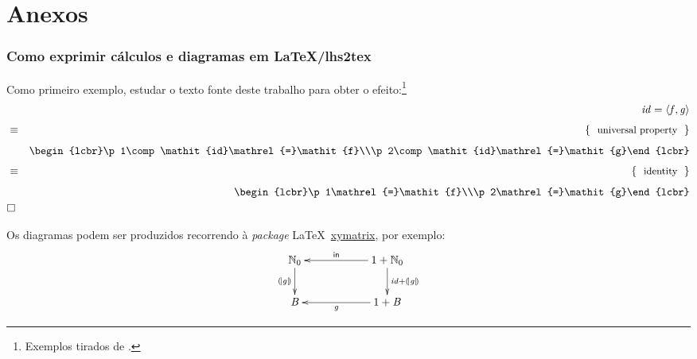 \documentclass[a4paper]{article}
\newcommand{\Conid}[1]{\mathit{#1}}
\newcommand{\Varid}[1]{\mathit{#1}}
\begin{document}
\newpage

\part*{Anexos}

\appendix

\section{Como exprimir cálculos e diagramas em LaTeX/lhs2tex}
Como primeiro exemplo, estudar o texto fonte deste trabalho para obter o
efeito:\footnote{Exemplos tirados de \cite{Ol18}.}
\begin{eqnarray*}
\start
	\ensuremath{\Varid{id}\mathrel{=}\conj{\Varid{f}}{\Varid{g}}}
%
\just\equiv{ universal property }
%
        \ensuremath{\begin{lcbr}\p1\comp \Varid{id}\mathrel{=}\Varid{f}\\\p2\comp \Varid{id}\mathrel{=}\Varid{g}\end{lcbr}}
%
\just\equiv{ identity }
%
        \ensuremath{\begin{lcbr}\p1\mathrel{=}\Varid{f}\\\p2\mathrel{=}\Varid{g}\end{lcbr}}
\qed
\end{eqnarray*}

Os diagramas podem ser produzidos recorrendo à \emph{package} \LaTeX\
\href{https://ctan.org/pkg/xymatrix}{xymatrix}, por exemplo:
\begin{eqnarray*}
\xymatrix@C=2cm{
    \ensuremath{\N_0}
           \ar[d]_-{\ensuremath{\cata{\Varid{g}}}}
&
    \ensuremath{\mathrm{1}\mathbin{+}\N_0}
           \ar[d]^{\ensuremath{\Varid{id}\mathbin{+}\cata{\Varid{g}}}}
           \ar[l]_-{\ensuremath{\mathsf{in}}}
\\
     \ensuremath{\Conid{B}}
&
     \ensuremath{\mathrm{1}\mathbin{+}\Conid{B}}
           \ar[l]^-{\ensuremath{\Varid{g}}}
}
\end{eqnarray*}
\end{document}
